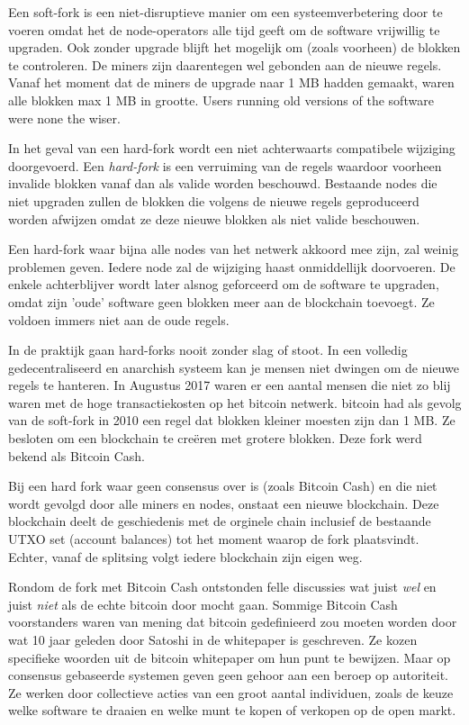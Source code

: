 Een soft-fork is een niet-disruptieve manier om een systeemverbetering door te voeren omdat het de node-operators alle tijd geeft om de software vrijwillig te upgraden. Ook zonder upgrade blijft het mogelijk om (zoals voorheen) de blokken te controleren. De miners zijn daarentegen wel gebonden aan de nieuwe regels. Vanaf het moment dat de miners de upgrade naar 1 MB hadden gemaakt, waren alle blokken max 1 MB in grootte. Users running old versions of the software
were none the wiser. 

In het geval van een hard-fork wordt een niet achterwaarts compatibele wijziging doorgevoerd. Een \textit{hard-fork} is een verruiming van de regels waardoor voorheen invalide blokken vanaf dan als valide worden beschouwd. Bestaande nodes die niet upgraden zullen de blokken die volgens de nieuwe regels geproduceerd worden afwijzen omdat ze deze nieuwe blokken als niet valide beschouwen. 

Een hard-fork waar bijna alle nodes van het netwerk akkoord mee zijn,  zal weinig problemen geven. Iedere node zal de wijziging haast onmiddellijk doorvoeren. De enkele achterblijver wordt later alsnog geforceerd om de software te upgraden, omdat zijn 'oude' software geen blokken meer aan de blockchain toevoegt. Ze voldoen immers niet aan de oude regels.

In de praktijk gaan hard-forks nooit zonder slag of stoot. In een volledig gedecentraliseerd en anarchish systeem kan je mensen niet dwingen om de nieuwe regels te hanteren. In Augustus 2017 waren er een aantal mensen die niet zo blij waren met de hoge transactiekosten op het bitcoin netwerk. bitcoin had als gevolg van de soft-fork in 2010 een regel dat blokken kleiner moesten zijn dan 1 MB. Ze besloten om een blockchain te creëren met grotere blokken. Deze fork werd bekend als Bitcoin Cash.  

Bij een hard fork waar geen consensus over is (zoals Bitcoin Cash) en die niet wordt gevolgd door alle miners en nodes, onstaat een nieuwe blockchain. Deze blockchain deelt de geschiedenis met de orginele chain inclusief de bestaande UTXO set (account balances) tot het moment waarop de fork plaatsvindt. Echter, vanaf de splitsing volgt iedere blockchain zijn eigen weg. 

Rondom de fork met Bitcoin Cash ontstonden felle discussies wat juist \textit{wel} en juist \textit{niet} als de echte bitcoin door mocht gaan. Sommige Bitcoin Cash voorstanders waren van mening dat bitcoin gedefinieerd zou moeten worden door wat 10 jaar geleden door Satoshi in de whitepaper is geschreven. Ze kozen specifieke woorden uit de bitcoin whitepaper om hun punt te bewijzen. Maar op consensus gebaseerde systemen geven geen gehoor aan een beroep op autoriteit. Ze werken door collectieve acties van een groot aantal individuen, zoals de keuze welke software te draaien en welke munt te kopen of verkopen op de open markt.

